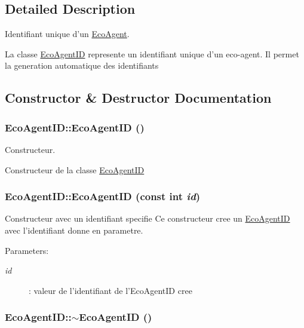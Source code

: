 \subsection{Detailed Description}
Identifiant unique d'un \hyperlink{classEcoAgent}{EcoAgent}. 

La classe \hyperlink{classEcoAgentID}{EcoAgentID} represente un identifiant unique d'un eco-agent. Il permet la generation automatique des identifiants 

\subsection{Constructor \& Destructor Documentation}
\hypertarget{classEcoAgentID_9c337e2ad56912db99193c03d1f82c56}{
\subsubsection[{EcoAgentID}]{\setlength{\rightskip}{0pt plus 5cm}EcoAgentID::EcoAgentID ()}}
\label{classEcoAgentID_9c337e2ad56912db99193c03d1f82c56}


Constructeur. 

Constructeur de la classe \hyperlink{classEcoAgentID}{EcoAgentID} \hypertarget{classEcoAgentID_ac86e5972be4318755f16a28c3f0d2dc}{
\subsubsection[{EcoAgentID}]{\setlength{\rightskip}{0pt plus 5cm}EcoAgentID::EcoAgentID (const int {\em id})}}
\label{classEcoAgentID_ac86e5972be4318755f16a28c3f0d2dc}


Constructeur avec un identifiant specifie Ce constructeur cree un \hyperlink{classEcoAgentID}{EcoAgentID} avec l'identifiant donne en parametre. 

\begin{Desc}
\item[Parameters:]
\begin{description}
\item[{\em id}]: valeur de l'identifiant de l'EcoAgentID cree \end{description}
\end{Desc}
\hypertarget{classEcoAgentID_97da1c0ae8891bbf10feb0574ef64a26}{
\subsubsection[{$\sim$EcoAgentID}]{\setlength{\rightskip}{0pt plus 5cm}EcoAgentID::$\sim$EcoAgentID ()}}
\label{classEcoAgentID_97da1c0ae8891bbf10feb0574ef64a26}


